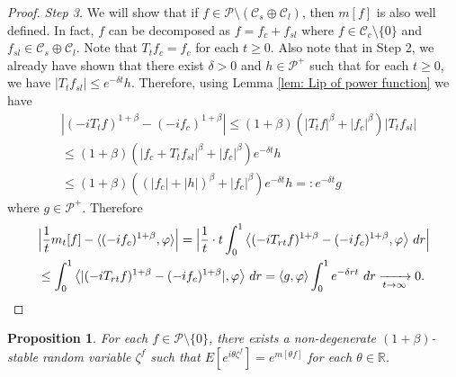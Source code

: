 \documentclass[12pt,a4paper]{amsart}
\theoremstyle{plain}
\newtheorem{prop}[thm]{Proposition}
\theoremstyle{definition}
\numberwithin{equation}{section}
\begin{document}
\begin{proof}
  \emph{Step 3.} We will show that if $f\in \mathcal P \setminus (\mathcal C_s \oplus \mathcal C_l)$, then $m[f]$ is also well defined.
  In fact, $f$ can be decomposed as $f = f_c + f_{sl}$ where $f \in \mathcal C_c\setminus \{0\}$ and $f_{sl}\in \mathcal C_s \oplus \mathcal C_l$.
  Note that $T_t f_c = f_c$ for each $t\geq 0$.
   Also note that in Step 2, we already have shown that there exist $\delta > 0$ and  $h \in \mathcal P^+$
  such that for each $t\geq 0$, we have $|T_t f_{sl}| \leq e^{- \delta t}h$.
  Therefore, using Lemma \ref{lem: Lip of power function} we have
\begin{align}
  &|(-iT_t f)^{1+\beta} - (-i f_c)^{1+\beta}|
  \leq (1+\beta) ( |T_tf|^\beta + |f_c|^\beta) |T_tf_{sl}|
  \\&\leq (1+\beta) ( |f_c + T_t f_{sl}|^\beta + |f_c|^\beta) e^{- \delta t} h
  \\&\leq (1+\beta) ( (|f_c| + |h|)^\beta + |f_c|^\beta) e^{- \delta t} h
  =: e^{- \delta t} g
\end{align}
where $g\in \mathcal P^+$.
Therefore
\begin{align}
  \label{eq:P:S:1}
  &\Big| \frac{1}{t} m_t[f] - \langle (-if_c)^{1+\beta}, \varphi\rangle\Big|
  = \Big| \frac{1}{t} \cdot t \int_0^1  \big\langle (-iT_{rt}f)^{1+\beta} - (-if_c)^{1+\beta}, \varphi\big \rangle ~dr \Big|\\
  &\leq \int_0^1  \big\langle |(-iT_{rt}f)^{1+\beta} - (-if_c)^{1+\beta}|, \varphi\big \rangle ~dr = \langle g,\varphi\rangle\int_0^1 e^{-\delta rt} ~dr
    \xrightarrow[t\to \infty]{} 0.
    \qedhere
\end{align}
\end{proof}


\begin{prop}
  \label{prop:PL:S}
  For each $f \in \mathcal P\setminus \{0\}$, there exists a non-degenerate $(1+\beta)$-stable random variable $\zeta^f$ such that
\(
  E[e^{i\theta\zeta^f}] = e^{m[\theta f]}
\)
for each $\theta \in \mathbb R$.
\end{prop}
\end{document}
